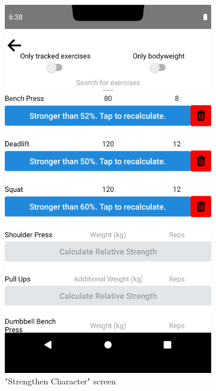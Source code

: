 \documentclass{l4proj}
\begin{document}
\begin{figure}[H]
    \begin{subfigure}{0.45\textwidth}
        \includegraphics[width=\textwidth]{exercise_modal.png}
        \caption{"Strengthen Character" screen} 
    \end{subfigure}
    \begin{subfigure}{0.45\textwidth}

\end{subfigure}
\end{figure}
\end{document}
